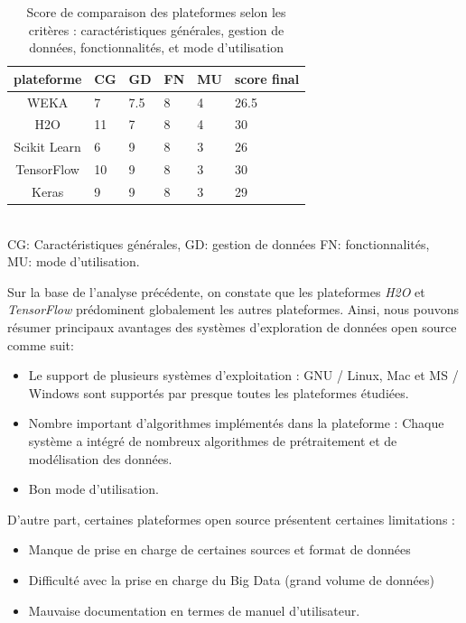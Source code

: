 \begin{table}[!h]
    \centering
    \begin{tabular}{|c|p{1.5cm}|p{1.5cm}|p{1.5cm}|p{1.5cm}|p{2.5cm}|}
       \hline
       \textbf{plateforme}  & \textbf{CG} & \textbf{GD} & \textbf{FN} & \textbf{MU} &\textbf{score final}\\ \hline
       WEKA  &  7 & 7.5 & 8 & 4 & 26.5\\
       H2O   &  11 & 7 & 8 & 4 & 30\\
       Scikit Learn &  6 & 9 & 8 & 3 & 26\\
       TensorFlow & 10 & 9 & 8 & 3 & 30\\
       Keras &  9 & 9 & 8 & 3 & 29\\ \hline
    \end{tabular}
    \footnotesize{\\  CG: Caractéristiques générales,  GD: gestion de données  FN: fonctionnalités, \\  MU: mode d'utilisation.}
    \caption{Score de comparaison des plateformes selon les critères : caractéristiques générales, gestion de données, fonctionnalités, et mode d'utilisation}
    \label{tab:score-comp}
\end{table}

Sur la base de l'analyse précédente, on constate que les plateformes \textit{H2O} et \textit{TensorFlow} prédominent globalement les autres plateformes. Ainsi, nous pouvons résumer principaux avantages des systèmes d'exploration de données open source comme suit:\\

\begin{itemize}
    \item[\ding{224}] Le support de plusieurs systèmes d'exploitation : GNU / Linux, Mac et MS / Windows sont supportés par presque toutes les plateformes étudiées.
    \item[\ding{224}] Nombre important d'algorithmes implémentés dans la plateforme : Chaque système a intégré de nombreux algorithmes de prétraitement et de modélisation des données. 
    \item[\ding{224}] Bon mode d'utilisation.\\
\end{itemize}

D'autre part, certaines plateformes open source présentent certaines limitations :\\

\begin{itemize}
    \item[\ding{224}] Manque de prise en charge de certaines sources et format de données
    \item[\ding{224}] Difficulté avec la prise en charge du Big Data (grand volume de données) 
    \item[\ding{224}] Mauvaise  documentation en termes de manuel d'utilisateur.\\
\end{itemize}


